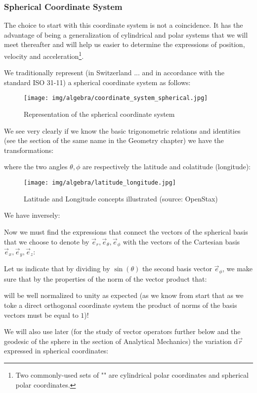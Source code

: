 	\pagebreak
	\subsubsection{Spherical Coordinate System}\label{spherical coordinates}
	The choice to start with this coordinate system is not a coincidence. It has the advantage of being a generalization of cylindrical and polar systems that we will meet thereafter and will help us easier to determine the expressions of position, velocity and acceleration\footnote{Two commonly-used sets of "" are cylindrical polar coordinates and spherical polar coordinates.}\label{orthogonal curvilinear coordinates}.
	
	We traditionally represent (in Switzerland ... and in accordance with the standard ISO 31-11) a spherical coordinate system as follows:
	\begin{figure}[H]
		\centering
		\texttt{[image: img/algebra/coordinate\_system\_spherical.jpg]}
		\caption{Representation of the spherical coordinate system}
	\end{figure}
	We see very clearly if we know the basic trigonometric relations and identities (see the section of the same name in the Geometry chapter) we have the transformations:
	
	
	where the two angles $\theta, \phi$ are respectively the latitude and colatitude (longitude):
	\begin{figure}[H]
		\centering
		\texttt{[image: img/algebra/latitude\_longitude.jpg]}
		\caption[Latitude and Longitude concepts illustrated]{Latitude and Longitude concepts illustrated (source: OpenStax)}
	\end{figure}
	We have inversely:
	
	Now we must find the expressions that connect the vectors of the spherical basis that we choose to denote by $\vec{e}_r,\vec{e}_\theta,\vec{e}_\phi$ with the vectors of the Cartesian basis $\vec{e}_x,\vec{e}_y,\vec{e}_z$:
	
	Let us indicate that by dividing by $\sin(\theta)$ the second basis vector $\vec{e}_\phi$, we make sure that by the properties of the norm of the vector product that:
	
	will be well normalized to unity as expected (as we know from start that as we toke a direct orthogonal coordinate system the product of norms of the basis vectors must be equal to $1$)!
	
	We will also use later (for the study of vector operators further below and the geodesic of the sphere in the section of Analytical Mechanics) the variation $\mathrm{d}\vec{r}$ expressed in spherical coordinates:
	
